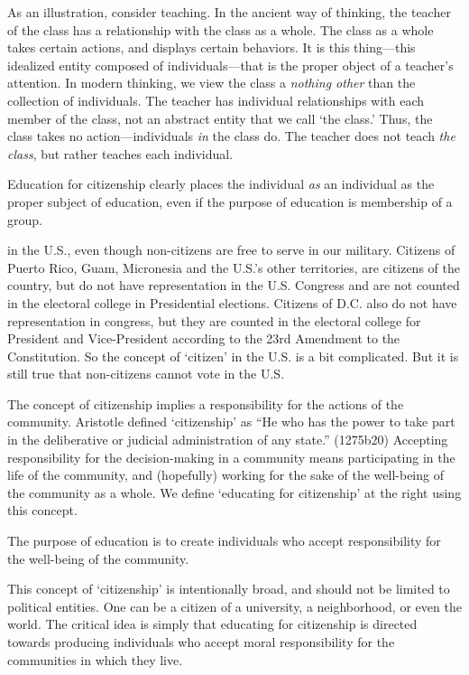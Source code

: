 As an illustration, consider teaching. In the ancient way of thinking, the teacher of the class has a relationship with the class as a whole. The class as a whole takes certain actions, and displays certain behaviors. It is this thing---this idealized entity composed of individuals---that is the proper object of a teacher's attention. In modern thinking, we view the class a \emph{nothing other} than the collection of individuals. The teacher has individual relationships with each member of the class, not an abstract entity that we call `the class.' Thus, the class takes no action---individuals \emph{in} the class do. The teacher does not teach \emph{the class}, but rather teaches each individual.

Education for citizenship clearly places the individual \emph{as} an individual as the proper subject of education, even if the purpose of education is membership of a group. 

 in the U.S., even though non-citizens are free to serve in our military. Citizens of Puerto Rico, Guam, Micronesia and the U.S.'s other territories, are citizens of the country, but do not have representation in the U.S. Congress and are not counted in the electoral college in Presidential elections. Citizens of D.C. also do not have representation in congress, but they are counted in the electoral college for President and Vice-President according to the 23rd Amendment to the Constitution. So the concept of `citizen' in the U.S. is a bit complicated. But it is still true that non-citizens cannot vote in the U.S.

The concept of citizenship implies a responsibility for the actions of the community. Aristotle defined `citizenship' as ``He who has the power to take part in the deliberative or judicial administration of any state.'' (1275b20) Accepting responsibility for the decision-making in a community means participating in the life of the community, and (hopefully) working for the sake of the well-being of the community as a whole. We define `educating for citizenship' at the right using this concept.  
\begin{purpose}\label{forcitizenship}
The purpose of education is to create individuals who accept responsibility for the well-being of the community.\end{purpose}


This concept of `citizenship' is intentionally broad, and should not be limited to political entities. One can be a citizen of a university, a neighborhood, or even the world. The critical idea is simply that educating for citizenship is directed towards producing individuals who accept moral responsibility for the communities in which they live.

